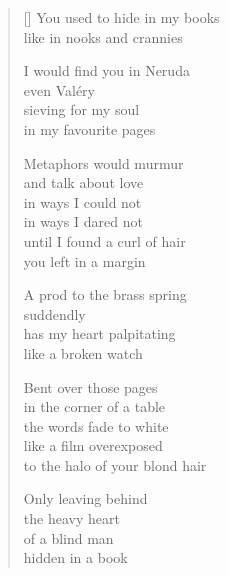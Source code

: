 \documentclass[12pt]{article}
\begin{document}
\thispagestyle{empty}

\poemtitle{}

\settowidth{\versewidth}{to the halo of your blond hair}

\bigskip

\begin{verse}[\versewidth]
  You used to hide in my books \\
  like in nooks and crannies

  I would find you in Neruda \\
  even Valéry \\
  sieving for my soul \\
  in my favourite pages

  Metaphors would murmur \\
  and talk about love \\
  in ways I could not \\
  in ways I dared not \\
  until I found a curl of hair \\
  you left in a margin

  A prod to the brass spring \\
  suddendly \\
  has my heart palpitating \\
  like a broken watch

  Bent over those pages \\
  in the corner of a table \\
  the words fade to white \\
  like a film overexposed \\
  to the halo of your blond hair

  Only leaving behind \\
  the heavy heart \\
  of a blind man \\
  hidden in a book
\end{verse}
\end{document}
